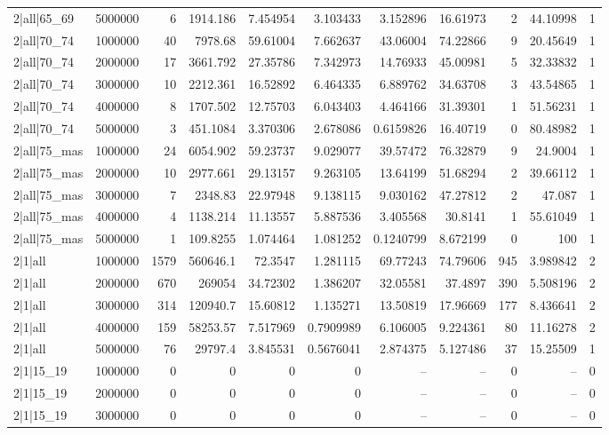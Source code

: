 \begin{tabular}{lrrrrrrrrrr}
2|all|65\_69 & 5000000 & 6 & 1914.186 & 7.454954 & 3.103433 & 3.152896 & 16.61973 & 2 & 44.10998 & 1 \\
2|all|70\_74 & 1000000 & 40 & 7978.68 & 59.61004 & 7.662637 & 43.06004 & 74.22866 & 9 & 20.45649 & 1 \\
2|all|70\_74 & 2000000 & 17 & 3661.792 & 27.35786 & 7.342973 & 14.76933 & 45.00981 & 5 & 32.33832 & 1 \\
2|all|70\_74 & 3000000 & 10 & 2212.361 & 16.52892 & 6.464335 & 6.889762 & 34.63708 & 3 & 43.54865 & 1 \\
2|all|70\_74 & 4000000 & 8 & 1707.502 & 12.75703 & 6.043403 & 4.464166 & 31.39301 & 1 & 51.56231 & 1 \\
2|all|70\_74 & 5000000 & 3 & 451.1084 & 3.370306 & 2.678086 & 0.6159826 & 16.40719 & 0 & 80.48982 & 1 \\
2|all|75\_mas & 1000000 & 24 & 6054.902 & 59.23737 & 9.029077 & 39.57472 & 76.32879 & 9 & 24.9004 & 1 \\
2|all|75\_mas & 2000000 & 10 & 2977.661 & 29.13157 & 9.263105 & 13.64199 & 51.68294 & 2 & 39.66112 & 1 \\
2|all|75\_mas & 3000000 & 7 & 2348.83 & 22.97948 & 9.138115 & 9.030162 & 47.27812 & 2 & 47.087 & 1 \\
2|all|75\_mas & 4000000 & 4 & 1138.214 & 11.13557 & 5.887536 & 3.405568 & 30.8141 & 1 & 55.61049 & 1 \\
2|all|75\_mas & 5000000 & 1 & 109.8255 & 1.074464 & 1.081252 & 0.1240799 & 8.672199 & 0 & 100 & 1 \\
2|1|all & 1000000 & 1579 & 560646.1 & 72.3547 & 1.281115 & 69.77243 & 74.79606 & 945 & 3.989842 & 2 \\
2|1|all & 2000000 & 670 & 269054 & 34.72302 & 1.386207 & 32.05581 & 37.4897 & 390 & 5.508196 & 2 \\
2|1|all & 3000000 & 314 & 120940.7 & 15.60812 & 1.135271 & 13.50819 & 17.96669 & 177 & 8.436641 & 2 \\
2|1|all & 4000000 & 159 & 58253.57 & 7.517969 & 0.7909989 & 6.106005 & 9.224361 & 80 & 11.16278 & 2 \\
2|1|all & 5000000 & 76 & 29797.4 & 3.845531 & 0.5676041 & 2.874375 & 5.127486 & 37 & 15.25509 & 1 \\
2|1|15\_19 & 1000000 & 0 & 0 & 0 & 0 & -- & -- & 0 & -- & 0 \\
2|1|15\_19 & 2000000 & 0 & 0 & 0 & 0 & -- & -- & 0 & -- & 0 \\
2|1|15\_19 & 3000000 & 0 & 0 & 0 & 0 & -- & -- & 0 & -- & 0 \\

\end{tabular}
